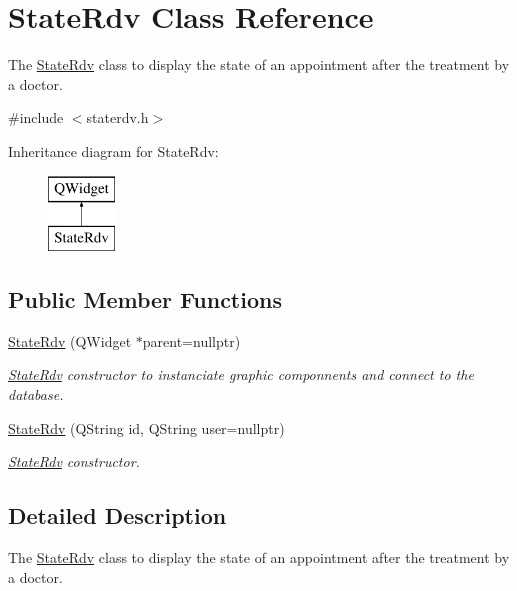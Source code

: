 \hypertarget{class_state_rdv}{}\section{State\+Rdv Class Reference}
\label{class_state_rdv}


The \mbox{\hyperlink{class_state_rdv}{State\+Rdv}} class to display the state of an appointment after the treatment by a doctor.  




{\ttfamily \#include $<$staterdv.\+h$>$}

Inheritance diagram for State\+Rdv\+:\begin{figure}[H]
\begin{center}
\leavevmode
\includegraphics[height=2.000000cm]{class_state_rdv}
\end{center}
\end{figure}
\subsection*{Public Member Functions}
\begin{DoxyCompactItemize}
\item 
\mbox{\hyperlink{class_state_rdv_a8ef7b475b753882741f521c8c53178f7}{State\+Rdv}} (Q\+Widget $\ast$parent=nullptr)
\begin{DoxyCompactList}\small\item\em \mbox{\hyperlink{class_state_rdv}{State\+Rdv}} constructor to instanciate graphic componnents and connect to the database. \end{DoxyCompactList}\item 
\mbox{\hyperlink{class_state_rdv_a65ba69e9e9d0a57a4f26bba8fa750aa1}{State\+Rdv}} (Q\+String id, Q\+String user=nullptr)
\begin{DoxyCompactList}\small\item\em \mbox{\hyperlink{class_state_rdv}{State\+Rdv}} constructor. \end{DoxyCompactList}\end{DoxyCompactItemize}


\subsection{Detailed Description}
The \mbox{\hyperlink{class_state_rdv}{State\+Rdv}} class to display the state of an appointment after the treatment by a doctor. 

